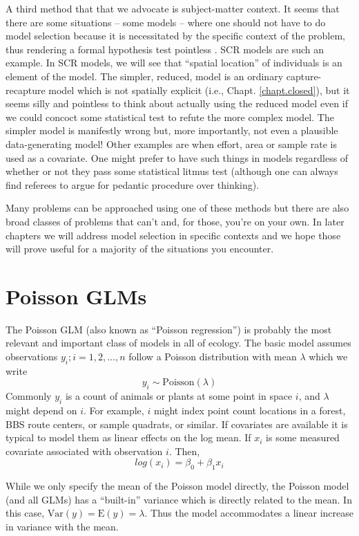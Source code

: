 A third method that that we advocate is subject-matter
context. It seems that there are some situations -- some models -- where one should not
have to do model selection because it is necessitated by the specific
context of the problem, thus rendering a formal hypothesis test pointless
\citep{johnson:1999}.
SCR models are such an example. In SCR models, we will see that
``spatial location'' of individuals is an element of the model. The
simpler, reduced, model is an ordinary capture-recapture model which
is not spatially explicit (i.e., Chapt. \ref{chapt.closed}),
but it seems silly and pointless to think about actually using the
reduced model even if we could concoct some statistical test to refute
the more complex model.  The simpler model is manifestly wrong but,
more importantly, not even a plausible data-generating model!
Other examples are when effort, area or
sample rate is used as a covariate. One might prefer to have such things in
models regardless of whether or not they pass some statistical litmus
test (although one can always find referees to argue for pedantic procedure
over thinking).


Many problems can be approached using one of these methods but there
are also broad classes of problems that can't and, for those, you're
on your own. In later chapters we will address model selection in
specific contexts and we hope those will prove useful for a majority
of the situations you encounter.


\section{Poisson GLMs}
\label{glms.sec.poisson}

The Poisson GLM (also known as ``Poisson regression'') is probably the
most relevant and important class of models in all of ecology. The
basic model assumes observations $y_{i}; i=1,2,...,n$ follow a Poisson
distribution with mean $\lambda$ which we write
\[
 	y_{i} \sim \mbox{Poisson}(\lambda)
\]
Commonly $y_{i}$ is a count of animals or plants at some point in
space $i$, and $\lambda$ might depend on $i$. For example, $i$ might index point
count locations in a forest, BBS route centers, or sample quadrats, or
similar.  If covariates are available it is typical to model them as
linear effects on the log mean. If $x_i$ is some measured covariate
associated with observation $i$. Then,
\[
 	log(x_i) = \beta_0  + \beta_1 x_i
\]

While we only specify the mean of the Poisson model directly, the
Poisson model (and all GLMs) has a ``built-in'' variance which is
directly related to the mean. In this case, $\mbox{Var}(y) = \mbox{E}(y) =
\lambda$. Thus the model accommodates a linear increase in variance
with the mean.


